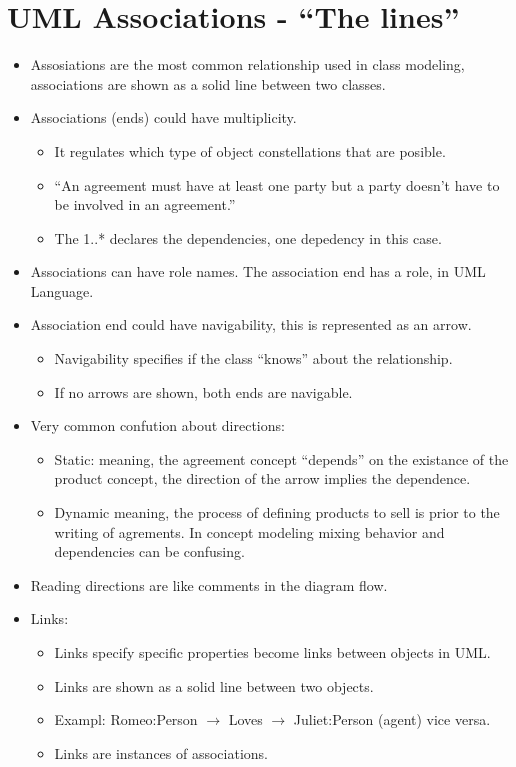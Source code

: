 \section{UML Associations - ``The lines''}
\begin{itemize}
    \item Assosiations are the most common relationship used in class modeling, associations are shown as a solid line between two classes.
    \item Associations (ends) could have multiplicity.
        \begin{itemize}
            \item It regulates which type of object constellations that are posible.
            \item ``An agreement must have at least one party but a party doesn't have to be involved in an agreement.''
            \item The 1..* declares the dependencies, one depedency in this case. 
        \end{itemize}
    
    \item Associations can have role names. The association end has a role, in UML Language.
    \item Association end could have navigability, this is represented as an arrow.
        \begin{itemize}
            \item Navigability specifies if the class ``knows'' about the relationship.
            \item If no arrows are shown, both ends are navigable.
        \end{itemize}
    
    \item Very common confution about directions:
        \begin{itemize}
            \item Static: meaning, the agreement concept ``depends'' on the existance of the product concept, the direction of the arrow implies the dependence. 
            \item Dynamic meaning, the process of defining products to sell is prior to the writing of agrements. In concept modeling mixing behavior and dependencies can be confusing.
        \end{itemize}
    
    \item Reading directions are like comments in the diagram flow.
    \item Links:
        \begin{itemize}
            \item Links specify specific properties become links between objects in UML. 
            \item Links are shown as a solid line between two objects. 
            \item Exampl: Romeo:Person $\rightarrow$ Loves $\rightarrow$ Juliet:Person (agent) vice versa.
            \item Links are instances of associations. 
        \end{itemize}
    

\end{itemize}
